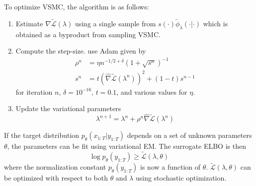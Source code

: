 \documentclass[12pt]{article}
\begin{document}
To optimize VSMC, the algorithm is as follows:
\begin{enumerate}

\item
Estimate $\nabla\tilde{\mathcal{L}}(\lambda)$ using a single sample from $s(\cdot)\tilde{\phi}_\lambda(\cdot|\cdot)$ which is obtained as a byproduct from sampling VSMC.

\item
Compute the step-size. \textcite{Naesseth:2018} use Adam given by
\begin{align*}
\rho^n &= \eta n^{-1/2+\delta}(1+\sqrt{s^n})^{-1} \\
s^n &= t\left(\hat{\nabla}\tilde{\mathcal{L}}(\lambda^n)\right)^2+(1-t)s^{n-1}
\end{align*}
for iteration $n$, $\delta=10^{-16}$, $t=0.1$, and various values for $\eta$.

\item
Update the variational parameters
\[
\lambda^{n+1} = \lambda^n+\rho^n\hat{\nabla}\tilde{\mathcal{L}}(\lambda^n)
\]

\end{enumerate}

If the target distribution $p_\theta(x_{1:T}|y_{1:T})$ depends on a set of unknown parameters $\theta$, the parameters can be fit using variational EM. The surrogate ELBO is then
\[
\log p_\theta(y_{1:T}) \geq \tilde{\mathcal{L}}(\lambda,\theta)
\]
where the normalization constant $p_\theta(y_{1:T})$ is now a function of $\theta$. $\tilde{\mathcal{L}}(\lambda,\theta)$ can be optimized with respect to both $\theta$ and $\lambda$ using stochastic optimization.




\newpage

\printbibliography
\end{document}
